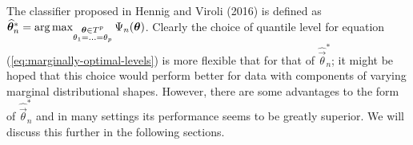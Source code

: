 The classifier proposed in Hennig and Viroli (2016) is defined as
$\widehat{\bm{\theta}}_n^{*} = \operatorname*{arg\,max}_{\substack{\bm{\theta} \in T^p \\
    \theta_1 = ... = \theta_p}} \Psi_n(\bm{\theta})$.  Clearly the choice of
quantile level for equation (\ref{eq:marginally-optimal-levels}) is more
flexible that for that of $\widehat{\vec{\theta}}_n^{*}$; it might be hoped that
this choice would perform better for data with components of varying marginal
distributional shapes.  However, there are some advantages to the form of
$\widehat{\vec{\theta}}_n^{*}$ and in many settings its performance seems to be
greatly superior.  We will discuss this further in the following sections.











